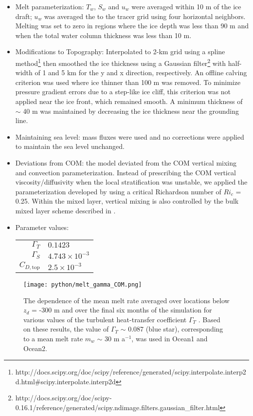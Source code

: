 \documentclass[11pt]{article} %
\begin{document}
\begin{itemize}
\item Melt parameterization: $T_w$, $S_w$ and $u_w$ were averaged within 10 m of the ice draft; $u_w$ was averaged the to the tracer grid using four horizontal neighbors. Melting was set to zero in regions where the ice depth was less than 90 m and when the total water column thickness was less than 10 m.

\item Modifications to Topography: Interpolated to 2-km grid using a spline method\footnote{http://docs.scipy.org/doc/scipy/reference/generated/scipy.interpolate.interp2d.html\#scipy.interpolate.interp2d} then smoothed the ice thickness using a Gaussian filter\footnote{http://docs.scipy.org/doc/scipy-0.16.1/reference/generated/scipy.ndimage.filters.gaussian\_filter.html} with half-width of 1 and 5 km for the y and x direction, respectively. An offline calving criterion was used where ice thinner than 100 m was removed. To minimize pressure gradient errors due to a step-like ice cliff, this criterion was not applied near the ice front, which remained smooth. A minimum thickness of $\sim$ 40 m was maintained by decreasing the ice thickness near the grounding line.  

\item Maintaining sea level: mass fluxes were used and no corrections were applied to maintain the sea level unchanged.  

\item Deviations from COM: the model deviated from the COM vertical mixing and convection parameterization. Instead of prescribing the COM vertical viscosity/diffusivity when the local stratification was unstable, we applied the parameterization developed by \cite{Jackson2008} using a critical Richardson number of $Ri_c$ = 0.25. Within the mixed layer, vertical mixing is also controlled by the bulk mixed layer scheme described in \cite{Hallberg2003}.

\item Parameter values:

\begin{tabular}{rl}
$\Gamma_T$ & $0.1423$ \\
$\Gamma_S$ & $4.743 \times 10^{-3}$ \\
$C_{D,\textrm{top}}$ & $2.5 \times 10^{-3}$
\end{tabular}
\end{itemize}

\begin{figure}[htbp]
\begin{center}
\texttt{[image: python/melt\_gamma\_COM.png]}
\label{fig1}
\caption{The dependence of the mean melt rate averaged over locations below $z_d$ = -300 m and over the final six months of the simulation for various values of the turbulent heat-transfer coefficient $\Gamma_T$ . Based on these results, the value of $\Gamma_T$ $\sim$ 0.087 (blue star), corresponding to a mean melt rate $m_w$ $\sim$ 30 m a$^{-1}$, was used in Ocean1 and Ocean2.}
\end{center}
\end{figure}






\end{document}
